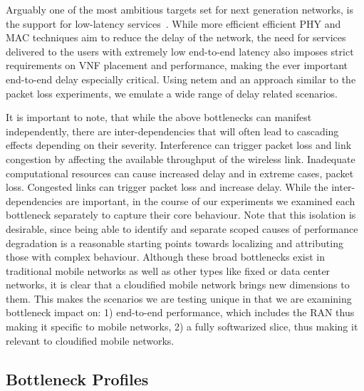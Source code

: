 \documentclass[journal,comsoc]{IEEEtran}
\begin{document}
\begin{description}[style=unboxed,leftmargin=0cm]
\item[Delay.] Arguably one of the most ambitious targets set for next generation networks, is the support for low-latency services~\cite{5gppp}. While more efficient efficient PHY and MAC techniques aim to reduce the delay of the network, the need for services delivered to the users with extremely low end-to-end latency also imposes strict requirements on VNF placement and performance, making the ever important end-to-end delay especially critical.
Using netem and an approach similar to the packet loss experiments, we emulate a wide range of delay related scenarios.

\end{description}


\medskip
It is important to note, that while the above bottlenecks can manifest independently, there are inter-dependencies that will often lead to cascading effects depending on their severity.
Interference can trigger packet loss and link congestion by affecting the available throughput of the wireless link. 
Inadequate computational resources can cause increased delay and in extreme cases, packet loss.
Congested links can trigger packet loss and increase delay.
While the inter-dependencies are important, in the course of our experiments we examined each bottleneck separately to capture their core behaviour.
Note that this isolation is desirable, since being able to identify and separate scoped causes of performance degradation is a reasonable starting points towards localizing and attributing those with complex behaviour.   
Although these broad bottlenecks exist in traditional mobile networks as well as other types like fixed or data center networks, it is clear that a cloudified mobile network brings new dimensions to them.  
This makes the scenarios we are testing unique in that we are examining bottleneck impact on: 1) end-to-end performance, which includes the RAN thus making it specific to mobile networks,  2) a fully softwarized slice, thus making it relevant to cloudified mobile networks.

\subsection{Bottleneck Profiles}
\end{document}
